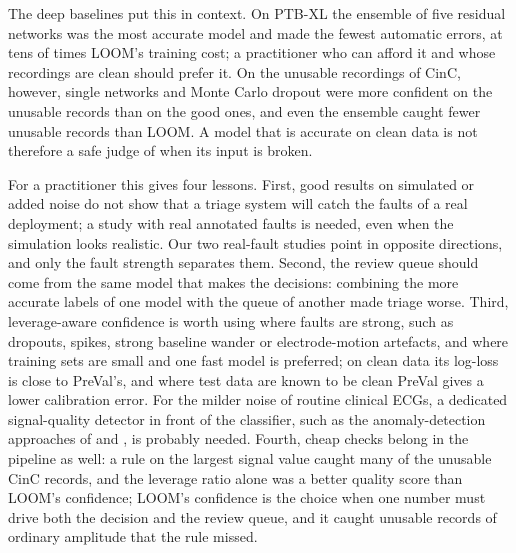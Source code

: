 \documentclass[preprint,12pt,authoryear]{elsarticle}
\begin{document}
The deep baselines put this in context. On PTB-XL the ensemble of five residual networks was the most accurate model and made the fewest automatic errors, at tens of times LOOM's training cost; a practitioner who can afford it and whose recordings are clean should prefer it. On the unusable recordings of CinC, however, single networks and Monte Carlo dropout were more confident on the unusable records than on the good ones, and even the ensemble caught fewer unusable records than LOOM. A model that is accurate on clean data is not therefore a safe judge of when its input is broken.

For a practitioner this gives four lessons. First, good results on simulated or added noise do not show that a triage system will catch the faults of a real deployment; a study with real annotated faults is needed, even when the simulation looks realistic. Our two real-fault studies point in opposite directions, and only the fault strength separates them. Second, the review queue should come from the same model that makes the decisions: combining the more accurate labels of one model with the queue of another made triage worse. Third, leverage-aware confidence is worth using where faults are strong, such as dropouts, spikes, strong baseline wander or electrode-motion artefacts, and where training sets are small and one fast model is preferred; on clean data its log-loss is close to PreVal's, and where test data are known to be clean PreVal gives a lower calibration error. For the milder noise of routine clinical ECGs, a dedicated signal-quality detector in front of the classifier, such as the anomaly-detection approaches of \citet{han2025diffusion} and \citet{ibrahim2025uad}, is probably needed. Fourth, cheap checks belong in the pipeline as well: a rule on the largest signal value caught many of the unusable CinC records, and the leverage ratio alone was a better quality score than LOOM's confidence; LOOM's confidence is the choice when one number must drive both the decision and the review queue, and it caught unusable records of ordinary amplitude that the rule missed.
\end{document}
